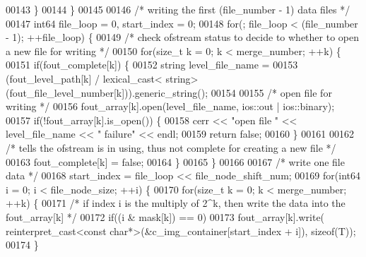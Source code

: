 \begin{DoxyCode}
00143                 \}
00144         \}
00145 
00146         \textcolor{comment}{/* writing the first (file\_number - 1) data files */}
00147         int64 file\_loop = 0, start\_index = 0;
00148         \textcolor{keywordflow}{for}(; file\_loop < (file\_number - 1); ++file\_loop) \{
00149                 \textcolor{comment}{/* check ofstream status to decide to whether to open a new
       file for writing */}
00150                 \textcolor{keywordflow}{for}(\textcolor{keywordtype}{size\_t} k = 0; k < merge\_number; ++k) \{
00151                         \textcolor{keywordflow}{if}(fout\_complete[k]) \{
00152                                 \textcolor{keywordtype}{string} level\_file\_name =
00153                                         (fout\_level\_path[k] / lexical\_cast<\textcolor{keywordtype}{
      string}>(fout\_file\_level\_number[k])).generic\_string();
00154 
00155                                 \textcolor{comment}{/* open file for writing */}
00156                                 fout\_array[k].open(level\_file\_name, ios::out | 
      ios::binary);
00157                                 \textcolor{keywordflow}{if}(!fout\_array[k].is\_open()) \{
00158                                         cerr << \textcolor{stringliteral}{"open file "} << level\_file\_name
       << \textcolor{stringliteral}{" failure"} << endl;
00159                                         \textcolor{keywordflow}{return} \textcolor{keyword}{false};
00160                                 \}
00161 
00162                                 \textcolor{comment}{/* tells the ofstream is in using, thus not
       complete for creating a new file */}
00163                                 fout\_complete[k] = \textcolor{keyword}{false};
00164                         \}
00165                 \}
00166 
00167                 \textcolor{comment}{/* write one file data */}
00168                 start\_index = file\_loop << file\_node\_shift\_num;
00169                 \textcolor{keywordflow}{for}(int64 i = 0; i < file\_node\_size; ++i) \{
00170                         \textcolor{keywordflow}{for}(\textcolor{keywordtype}{size\_t} k = 0; k < merge\_number; ++k) \{
00171                                 \textcolor{comment}{/* if index i is the multiply of 2^k, then
       write the data into the fout\_array[k] */}
00172                                 \textcolor{keywordflow}{if}((i & mask[k]) == 0)
00173                                         fout\_array[k].write(
      reinterpret\_cast<const char*>(&c\_img\_container[start\_index + i]), \textcolor{keyword}{sizeof}(T));
00174                         \}

\end{DoxyCode}
